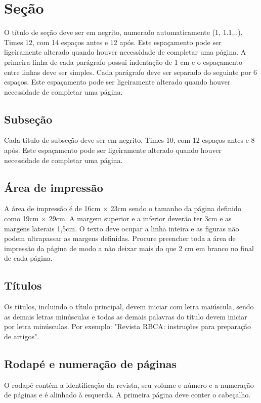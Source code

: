 \documentclass{RBCA}
\begin{document}
\section{Seção}
O título de seção deve ser em negrito, numerado automaticamente (1, 1.1,..), Times 12, com 14 espaços antes e 12 após. Este espaçamento pode ser ligeiramente alterado quando houver necessidade de completar uma página. A primeira linha de cada parágrafo possui indentação de 1 cm e o espaçamento entre linhas deve ser simples. Cada parágrafo  deve ser separado do seguinte por 6 espaços. Este espaçamento pode ser ligeiramente alterado quando houver necessidade de completar uma página.

\subsection{Subseção}
Cada título de subseção deve ser em negrito, Times 10, com 12 espaços antes e 8 após. Este espaçamento pode ser ligeiramente alterado quando houver necessidade de completar uma página.

\subsection{Área de impressão}
A área de impressão é de 16cm $\times$ 23cm sendo o tamanho da página definido como 19cm $\times$ 29cm. A margem superior e a inferior deverão ter 3cm e as margens laterais 1,5cm. O texto deve ocupar a linha inteira e as figuras não podem ultrapassar as margens definidas. Procure preencher toda a área de impressão da página de modo a não deixar mais do que 2 cm em branco no final de cada página.

\subsection{Títulos}
Os títulos, incluindo o título principal, devem iniciar com letra maiúscula, sendo as demais letras minúsculas e todas as demais palavras do título devem iniciar por letra minúsculas. Por exemplo: "Revista RBCA: instruções para preparação de artigos".

\subsection{Rodapé e numeração de páginas}
O rodapé contém a identificação da revista, seu volume e número e a numeração de páginas e é alinhado à esquerda. A primeira página deve conter o cabeçalho.
\end{document}
